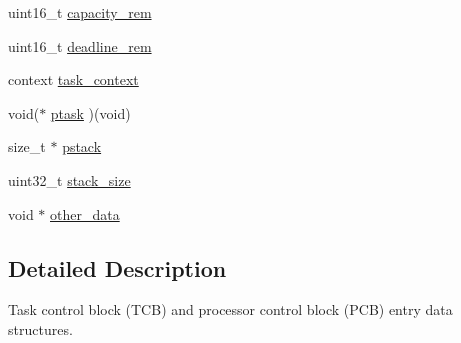 \begin{DoxyCompactItemize}
\item 
uint16\-\_\-t \hyperlink{structtcb__entry_a559dce8ac2982d3c8f46808ddc52bbb9}{capacity\-\_\-rem}
\item 
uint16\-\_\-t \hyperlink{structtcb__entry_af2ba0dde6c7ae71b6341714bf096cc80}{deadline\-\_\-rem}
\item 
context \hyperlink{structtcb__entry_a589e6c94b17a97df5d22edf504acfd42}{task\-\_\-context}
\item 
void($\ast$ \hyperlink{structtcb__entry_a7ed7f2d228da0039f065f0c8a756b46d}{ptask} )(void)
\item 
size\-\_\-t $\ast$ \hyperlink{structtcb__entry_a48bcced7fc892ae8db7138786e38a898}{pstack}
\item 
uint32\-\_\-t \hyperlink{structtcb__entry_a2174ff4c5cf178e9dc3d652c472b23dd}{stack\-\_\-size}
\item 
void $\ast$ \hyperlink{structtcb__entry_accd675f017bb0ec5ae63b4d729bd73aa}{other\-\_\-data}
\end{DoxyCompactItemize}


\subsection{Detailed Description}
Task control block (T\-C\-B) and processor control block (P\-C\-B) entry data structures. 

